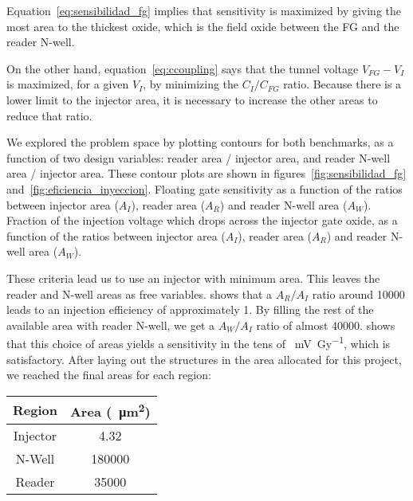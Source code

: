 Equation~\ref{eq:sensibilidad_fg} implies that sensitivity is maximized
by giving the most area to the thickest oxide,
which is the field oxide between the FG and the reader N-well.

On the other hand, equation~\ref{eq:ccoupling}
says that the tunnel voltage $V_{FG}-V_I$
is maximized, for a given $V_I$,
by minimizing the $C_I/C_{FG}$ ratio.
Because there is a lower limit to the injector area,
it is necessary to increase the other areas to reduce that ratio.

We explored the problem space by plotting contours for both benchmarks,
as a function of two design variables:
reader area / injector area,
and reader N-well area / injector area.
These contour plots are shown in figures~\ref{fig:sensibilidad_fg}
and~\ref{fig:eficiencia_inyeccion}.
{Floating gate sensitivity 
as a function of the ratios between
injector area ($A_I$),
reader area ($A_R$) 
and reader N-well area ($A_W$).}
{Fraction of the injection voltage which drops across the injector gate oxide,
as a function of the ratios between
injector area ($A_I$),
reader area ($A_R$) 
and reader N-well area ($A_W$).}

These criteria lead us to use an injector with minimum area.
This leaves the reader and N-well areas as free variables.
shows that a $A_R/A_I$ ratio around 10000
leads to an injection efficiency of approximately 1.
By filling the rest of the available area with reader N-well,
we get a $A_W/A_I$ ratio of almost 40000.
 shows that this choice of areas
yields a sensitivity in the tens of \SI{}{\milli\volt\per\gray},
which is satisfactory.
After laying out the structures in the area allocated for this project,
we reached the final areas for each region:
\begin{table}[h]
\centering
\begin{tabular}{|c|c|}
\hline
Region   & Area (\SI{}{\micro\meter\squared})\\ \hline
Injector & 4.32\\
N-Well     & 180000\\
Reader   & 35000\\
\hline
\end{tabular}
\end{table}
%
